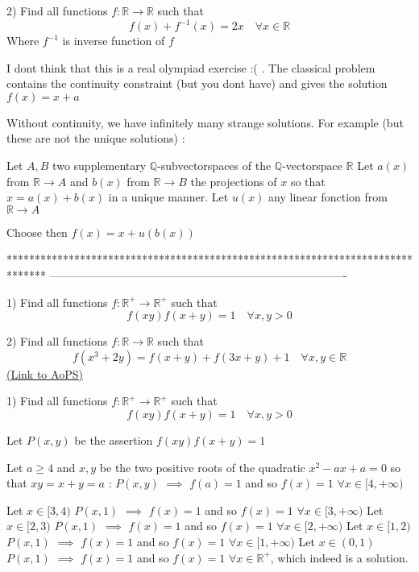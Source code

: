 \begin{solution}
	\begin{tcolorbox}2) Find all  functions $f:\mathbb{R}\to\mathbb{R}$   such that
\[f(x)+f^{-1}(x)=2x \quad \forall x\in\mathbb{R}\] 
Where $f^{-1}$ is inverse function of $f$\end{tcolorbox}
I dont think that this is a real olympiad exercise :( .
The classical problem contains the continuity constraint (but you dont have) and gives the solution $f(x)=x+a$

Without continuity, we have infinitely many strange solutions.
For example (but these are not the unique solutions) :

Let $A,B$ two supplementary $\mathbb Q$-subvectorspaces of the $\mathbb Q$-vectorspace $\mathbb R$
Let $a(x)$ from $\mathbb R\to A$ and $b(x)$ from $\mathbb R\to B$ the projections of $x$ so that $x=a(x)+b(x)$ in a unique manner.
Let $u(x)$ any linear fonction from $\mathbb R\to A$

Choose then $f(x)=x+u(b(x))$
\end{solution}
*******************************************************************************
-------------------------------------------------------------------------------

\begin{problem}
	1) Find all  functions $f:\mathbb{R}^+\to\mathbb{R}^+$   such that
\[f(xy)f(x+y)=1 \quad \forall x,y>0\]

2) Find all  functions $f:\mathbb{R}\to\mathbb{R}$   such that
\[f\left ( x^{3}+2y \right )=f(x+y)+f(3x+y) +1 \quad \forall x,y \in \mathbb{R}\]
	\flushright \href{https://artofproblemsolving.com/community/c6h563767}{(Link to AoPS)}
\end{problem}



\begin{solution}
	\begin{tcolorbox}1) Find all  functions $f:\mathbb{R}^+\to\mathbb{R}^+$   such that
\[f(xy)f(x+y)=1 \quad \forall x,y>0\]\end{tcolorbox}
Let $P(x,y)$ be the assertion $f(xy)f(x+y)=1$

Let $a\ge 4$ and $x,y$ be the two positive roots of the quadratic $x^2-ax+a=0$ so that $xy=x+y=a$ : $P(x,y)$ $\implies$ $f(a)=1$ and so $f(x)=1$ $\forall x\in[4,+\infty)$

Let $x\in[3,4)$ $P(x,1)$ $\implies$ $f(x)=1$ and so $f(x)=1$ $\forall x\in[3,+\infty)$
Let $x\in[2,3)$ $P(x,1)$ $\implies$ $f(x)=1$ and so $f(x)=1$ $\forall x\in[2,+\infty)$
Let $x\in[1,2)$ $P(x,1)$ $\implies$ $f(x)=1$ and so $f(x)=1$ $\forall x\in[1,+\infty)$
Let $x\in(0,1)$ $P(x,1)$ $\implies$ $f(x)=1$ and so $\boxed{f(x)=1}$ $\forall x\in\mathbb R^+$, which indeed is a solution.
\end{solution}



